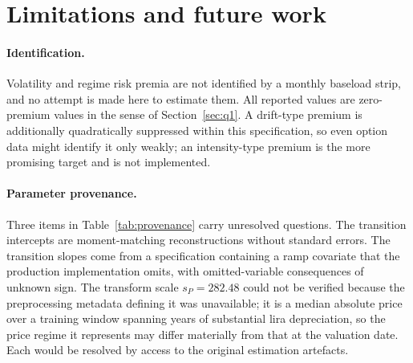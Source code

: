 \section{Limitations and future work}
\label{sec:limitations}

\paragraph{Identification.} Volatility and regime risk premia are not identified
by a monthly baseload strip, and no attempt is made here to estimate them. All
reported values are zero-premium values in the sense of Section~\ref{sec:q1}.
A drift-type premium is additionally quadratically suppressed within this
specification, so even option data might identify it only weakly; an
intensity-type premium is the more promising target and is not implemented.

\paragraph{Parameter provenance.} Three items in Table~\ref{tab:provenance}
carry unresolved questions. The transition intercepts are moment-matching
reconstructions without standard errors. The transition slopes come from a
specification containing a ramp covariate that the production implementation
omits, with omitted-variable consequences of unknown sign. The transform scale
$s_P=282.48$ could not be verified because the preprocessing metadata defining it
was unavailable; it is a median absolute price over a training window spanning
years of substantial lira depreciation, so the price regime it represents may
differ materially from that at the valuation date. Each would be resolved by
access to the original estimation artefacts.

